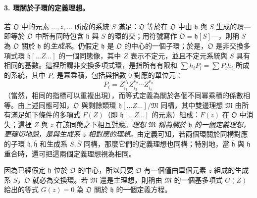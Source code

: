 \documentclass[11pt]{article}
\begin{document}
\paragraph{3. 環關於子環的定義理想。}
若 \(\mathfrak O\) 中的元素 \(\ldots,z,\ldots\) 所成的系統 \(S\) 滿足：\(\mathfrak O\) 等於在 \(\mathfrak O\) 中由 \(\mathfrak h\) 與 \(S\) 生成的環---即等於 \(\mathfrak O\) 中所有同時包含 \(\mathfrak h\) 與 \(S\) 的環的交；用符號寫作 \(\mathfrak O=\mathfrak h[S]\)---，則稱 \(S\) 為 \(\mathfrak O\) 關於 \(\mathfrak h\) 的\emph{生成系}。仍假定 \(\mathfrak h\) 是 \(\mathfrak O\) 的中心的一個子環；於是，\(\mathfrak O\) 是非交換多項式環 \(\mathfrak h[\ldots Z\ldots]\) 的一個同態像，其中 \(Z\) 表示不定元，並且不定元系統與 \(S\) 具有相同的基數。這裡所謂非交換多項式環，是指所有有限和 \(\sum h_iP_i=\sum P_i h_i\) 所成的系統，其中 \(P_i\) 是冪乘積，包括與指數 \(0\) 對應的單位元：
\[
P_i=Z_{i_1}^{\varrho_1}Z_{i_2}^{\varrho_2}\cdots Z_{i_n}^{\varrho_n}
\]
（當然，相同的指標可以重複出現），而等式定義為關於各個不同冪乘積的係數相等。由上述同態可知，\(\mathfrak O\) 與剩餘類環 \(\mathfrak h[\ldots Z\ldots]/\mathfrak M\) 同構，其中雙邊理想 \(\mathfrak M\) 由所有滿足如下條件的多項式 \(F(Z)\)（即 \(\mathfrak h[\ldots Z\ldots]\) 的元素）組成：\(F(z)\) 在 \(\mathfrak O\) 中消失；這裡 \(Z\) 與 \(z\) 在該同態之下相互對應。\emph{理想 \(\mathfrak M\) 稱為關於 \(\mathfrak h\) 的一個定義理想，更確切地說，是與生成系 \(z\) 相對應的理想。}由定義可知，若兩個環關於同構對應的子環 \(\mathfrak h,\overline{\mathfrak h}\) 和生成系 \(S,\overline S\) 同構，那麼它們的定義理想也同構；特別地，當 \(\overline{\mathfrak h}\) 與 \(\mathfrak h\) 重合時，還可把這兩個定義理想視為相同。

因為已經假定 \(\mathfrak h\) 位於 \(\mathfrak O\) 的中心，所以只要 \(\mathfrak O\) 有一個僅由單個元素 \(z\) 組成的生成系 \(S\)，\(\mathfrak O\) 就必為交換環。若 \(\mathfrak M\) 還是主理想，則稱由 \(\mathfrak M\) 的一個基多項式 \(G(Z)\) 給出的等式 \(G(z)=0\) 為 \(\mathfrak O\) 關於 \(\mathfrak h\) 的一個定義方程。
\end{document}
